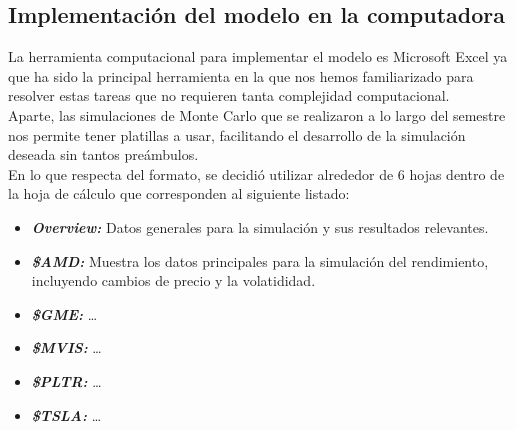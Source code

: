 \documentclass[letterpaper, 12pt]{article}
\begin{document}
\begin{justify}
        \section{Implementación del modelo en la computadora}
        \justify
        La herramienta computacional para implementar el modelo es Microsoft Excel ya que ha sido la principal herramienta en la que nos hemos familiarizado para resolver estas tareas que no requieren tanta complejidad computacional.
        \\\newline
        Aparte, las simulaciones de Monte Carlo que se realizaron a lo largo del semestre nos permite tener platillas a usar, facilitando el desarrollo de la simulación deseada sin tantos preámbulos.
        \\\newline
        En lo que respecta del formato, se decidió utilizar alrededor de 6 hojas dentro de la hoja de cálculo que corresponden al siguiente listado:
        \begin{itemize}
            \item \emph{\textbf{Overview:}} Datos generales para la simulación y sus resultados relevantes.
            \item \emph{\textbf{\$AMD:}} Muestra los datos principales para la simulación del rendimiento, incluyendo cambios de precio y la volatididad.
            \item \emph{\textbf{\$GME:}} \dots
            \item \emph{\textbf{\$MVIS:}} \dots
            \item \emph{\textbf{\$PLTR:}} \dots
            \item \emph{\textbf{\$TSLA:}} \dots
        \end{itemize}

\end{justify}
\end{document}
